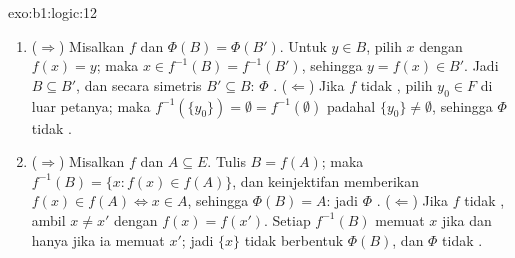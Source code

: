 \begin{solution}{exo:b1:logic:12}
\begin{enumerate}
  \item ($\Rightarrow$) Misalkan $f$  dan $\Phi(B) =
        \Phi(B')$. Untuk $y \in B$, pilih $x$ dengan $f(x) = y$; maka $x
        \in f^{-1}(B) = f^{-1}(B')$, sehingga $y = f(x) \in B'$. Jadi $B
        \subseteq B'$, dan secara simetris $B' \subseteq B$: $\Phi$
        . ($\Leftarrow$) Jika $f$ tidak , pilih $y_0
        \in F$ di luar petanya; maka $f^{-1}(\{y_0\}) = \emptyset =
        f^{-1}(\emptyset)$ padahal $\{y_0\} \neq \emptyset$, sehingga $\Phi$
        tidak .
  \item ($\Rightarrow$) Misalkan $f$  dan $A \subseteq E$. Tulis
        $B = f(A)$; maka $f^{-1}(B) = \{x : f(x) \in f(A)\}$, dan
        keinjektifan memberikan $f(x) \in f(A) \iff x \in A$, sehingga $\Phi(B) =
        A$: jadi $\Phi$ . ($\Leftarrow$) Jika $f$ tidak
        , ambil $x \neq x'$ dengan $f(x) = f(x')$. Setiap
          $f^{-1}(B)$ memuat $x$ jika dan hanya jika ia
        memuat $x'$; jadi $\{x\}$ tidak berbentuk $\Phi(B)$, dan
        $\Phi$ tidak .
\end{enumerate}
\end{solution}

